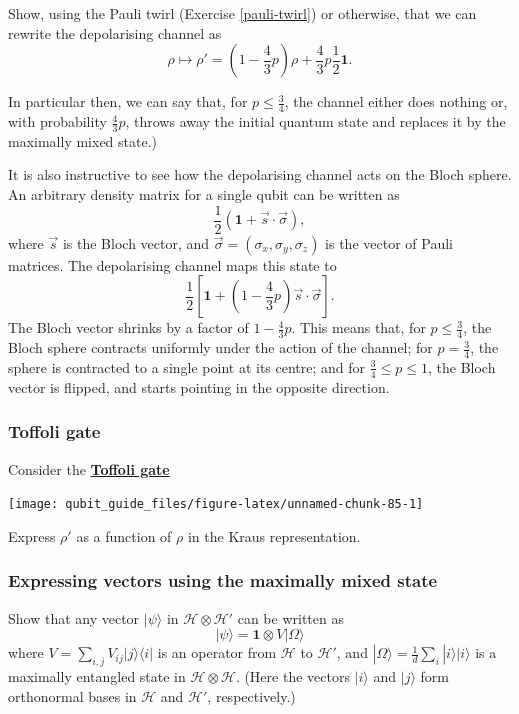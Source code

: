 \documentclass[fleqn,a4paper]{article}
\theoremstyle{definition}
\theoremstyle{definition}
\theoremstyle{definition}
\theoremstyle{definition}
\theoremstyle{remark}
\begin{document}
Show, using the Pauli twirl (Exercise \ref{pauli-twirl}) or otherwise, that we can rewrite the depolarising channel as
\[
  \rho \longmapsto \rho'
  = \left(1-\frac{4}{3} p\right) \rho + \frac{4}{3}p\frac{1}{2}\mathbf{1}.
\]

In particular then, we can say that, for \(p\leqslant\frac34\), the channel either does nothing or, with probability \(\frac{4}{3}p\), throws away the initial quantum state and replaces it by the maximally mixed state.)

It is also instructive to see how the depolarising channel acts on the Bloch sphere.
An arbitrary density matrix for a single qubit can be written as
\[
  \frac{1}{2}(\mathbf{1}+\vec{s}\cdot\vec{\sigma}),
\]
where \(\vec{s}\) is the Bloch vector, and \(\vec{\sigma}=(\sigma_x,\sigma_y,\sigma_z)\) is the vector of Pauli matrices.
The depolarising channel maps this state to
\[
  \frac{1}{2}\left[
    \mathbf{1}+ \left(1-\frac{4}{3}p\right)\vec{s}\cdot\vec{\sigma}
  \right].
\]
The Bloch vector shrinks by a factor of \(1-\frac{4}{3}p\).
This means that, for \(p\leqslant\frac{3}{4}\), the Bloch sphere contracts uniformly under the action of the channel;
for \(p=\frac{3}{4}\), the sphere is contracted to a single point at its centre;
and for \(\frac{3}{4}\leqslant p\leqslant 1\), the Bloch vector is flipped, and starts pointing in the opposite direction.

\hypertarget{toffoli-gate}{%
\subsubsection{Toffoli gate}\label{toffoli-gate}}

Consider the \href{https://en.wikipedia.org/wiki/Toffoli_gate}{\textbf{Toffoli gate}}

\begin{center}\texttt{[image: qubit\_guide\_files/figure-latex/unnamed-chunk-85-1]} \end{center}

Express \(\rho'\) as a function of \(\rho\) in the Kraus representation.

\hypertarget{vector-expression-omega}{%
\subsubsection{Expressing vectors using the maximally mixed state}\label{vector-expression-omega}}

Show that any vector \(|\psi\rangle\) in \(\mathcal{H}\otimes\mathcal{H}'\) can be written as
\[
  |\psi\rangle
  = \mathbf{1}\otimes V|\Omega\rangle
\]
where \(V=\sum_{i,j}V_{ij}|j\rangle\langle i|\) is an operator from \(\mathcal{H}\) to \(\mathcal{H}'\), and \(|\Omega\rangle=\frac{1}{d}\sum_i|i\rangle|i\rangle\) is a maximally entangled state in \(\mathcal{H}\otimes\mathcal{H}\).
(Here the vectors \(|i\rangle\) and \(|j\rangle\) form orthonormal bases in \(\mathcal{H}\) and \(\mathcal{H}'\), respectively.)
\end{document}

